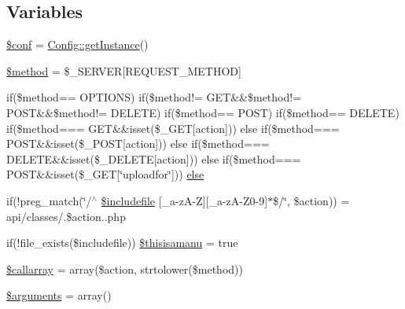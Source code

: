 \subsection*{Variables}
\begin{DoxyCompactItemize}
\item 
\hyperlink{a00082_ae4901046cc3e1deebf77ccc785384a78}{\$conf} = \hyperlink{a00018_ac93fbec81f07e5d15f80db907e63dc10}{Config\+::get\+Instance}()
\item 
\hyperlink{a00082_a12661b2fc0f57f97e30a1620889ce9c6}{\$method} = \$\+\_\+\+S\+E\+R\+V\+E\+R\mbox{[}\textquotesingle{}R\+E\+Q\+U\+E\+S\+T\+\_\+\+M\+E\+T\+H\+O\+D\textquotesingle{}\mbox{]}
\item 
if(\$method== \textquotesingle{}O\+P\+T\+I\+O\+N\+S\textquotesingle{}) if(\$method!= \textquotesingle{}G\+E\+T\textquotesingle{}\&\&\$method!= \textquotesingle{}P\+O\+S\+T\textquotesingle{}\&\&\$method!= \textquotesingle{}D\+E\+L\+E\+T\+E\textquotesingle{}) if(\$method== \textquotesingle{}P\+O\+S\+T\textquotesingle{}) if(\$method== \textquotesingle{}D\+E\+L\+E\+T\+E\textquotesingle{}) if(\$method=== \textquotesingle{}G\+E\+T\textquotesingle{}\&\&isset(\$\+\_\+\+G\+E\+T\mbox{[}\textquotesingle{}action\textquotesingle{}\mbox{]})) else if(\$method=== \textquotesingle{}P\+O\+S\+T\textquotesingle{}\&\&isset(\$\+\_\+\+P\+O\+S\+T\mbox{[}\textquotesingle{}action\textquotesingle{}\mbox{]})) else if(\$method=== \textquotesingle{}D\+E\+L\+E\+T\+E\textquotesingle{}\&\&isset(\$\+\_\+\+D\+E\+L\+E\+T\+E\mbox{[}\textquotesingle{}action\textquotesingle{}\mbox{]})) else if(\$method=== \textquotesingle{}P\+O\+S\+T\textquotesingle{}\&\&isset(\$\+\_\+\+G\+E\+T\mbox{[}\char`\"{}uploadfor\char`\"{}\mbox{]})) \hyperlink{a00082_a1d3defe87c04d4fc1443739d3831ebfe}{else}
\item 
if(!preg\+\_\+match(\char`\"{}/$^\wedge$ \hyperlink{a00082_a1c1b7d1432c2e06063bf8f9ad29ba19d}{\$includefile} \mbox{[}\+\_\+a-\/z\+A-\/Z\mbox{]}\mbox{[}\+\_\+a-\/z\+A-\/Z0-\/9\mbox{]}$\ast$\$/\char`\"{}, \$action)) = \textquotesingle{}api/classes/\textquotesingle{}.\$action.\textquotesingle{}.php\textquotesingle{}
\item 
if(!file\+\_\+exists(\$includefile)) \hyperlink{a00082_a36df20dc9373bab32c6e4ff30b9093c3}{\$thisisamanu} = true
\item 
\hyperlink{a00082_a0a2d1b1b87dbb189b9243f333ad904f3}{\$callarray} = array(\$action, strtolower(\$method))
\item 
\hyperlink{a00082_a61eded163d962fc248b3cf209000979b}{\$arguments} = array()
\end{DoxyCompactItemize}


